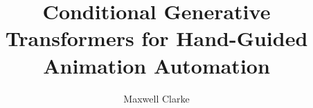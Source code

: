 \documentclass[12pt, a4paper, twoside, openright]{book}
\begin{document}
\frontmatter


\title{Conditional Generative Transformers for Hand-Guided Animation Automation}
\author{Maxwell Clarke}

\subject{Computer Science}


\mscbothparts







\maketitle



\tableofcontents
\clearpage

\listoffigures

\listoftables
\cleardoublepage


\mainmatter

















%
\printbibliography
\end{document}
